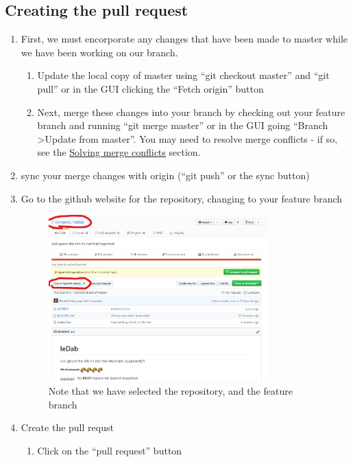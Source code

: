 \documentclass[a4paper, titlepage]{article}
\begin{document}
\subsection{Creating the pull request}
\label{BPRW_creating_pull_request}
\begin{enumerate}
	\item First, we must encorporate any changes that have been made to master while we have been working on our branch.
	\begin{enumerate}
		\item Update the local copy of master using ``git checkout master'' and ``git pull'' or in the GUI clicking the ``Fetch origin'' button
		\item Next, merge these changes into your branch by checking out your feature branch and running ``git merge master'' or in the GUI going ``Branch \textgreater Update from master''. You may need to resolve merge conflicts - if so, see the \hyperref[sec:solving_merge_conflicts]{Solving merge conflicts} section.
	\end{enumerate}
	\item sync your merge changes with origin (``git push'' or the sync button)
	\item Go to the github website for the repository, changing to your feature branch
	\begin{figure}[h]
		\centering
		\includegraphics[width=0.8\textwidth]{3github-website}
		\caption{Note that we have selected the repository, and the feature branch}
	\end{figure}
	\item Create the pull requst
	\begin{enumerate}
		\item Click on the ``pull request'' button
		\begin{figure}

\end{figure}
\end{enumerate}
\end{enumerate}
\end{document}
